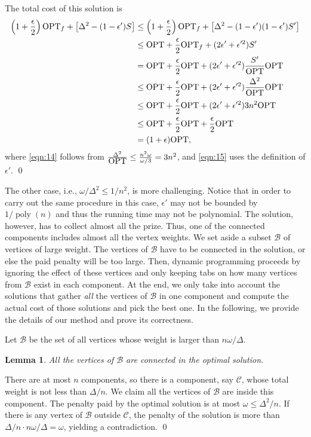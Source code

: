 \documentclass[extras,11pt]{article} \usepackage{fullpage}
\theoremstyle{mytheorem}
\newtheorem{lemma}[theorem]{Lemma}
\renewenvironment{proof}{\par\noindent{\bf Proof.}\hspace{0.5em}}
    {\hfill\qed\vspace{1ex}}
\DeclareMathOperator{\poly}{poly}
\newcommand{\eps}{\epsilon}
\newcommand{\B}{\mathcal{B}}
\newcommand{\OPT}{\mbox{\rm OPT}}
\begin{document}
\begin{proof} The total cost of this solution is
\begin{align}
       \left(1+\frac{\eps}{2}\right)\OPT_f + \left[\Delta^2 - (1-\eps')S\right]
&\leq  \left(1+\frac{\eps}{2}\right)\OPT_f + \left[\Delta^2 - (1-\eps')(1-\eps')S'\right]  \nonumber \\
&\leq  \OPT + \frac{\eps}{2}\OPT_f + (2\eps'+\eps'^2)S'  \nonumber \\
&=  \OPT + \frac{\eps}{2}\OPT + (2\eps'+\eps'^2)\frac{S'}{\OPT}\OPT  \nonumber\\
&\leq  \OPT + \frac{\eps}{2}\OPT + (2\eps'+\eps'^2)\frac{\Delta^2}{\OPT}\OPT   \nonumber\\
&\leq  \OPT + \frac{\eps}{2}\OPT + (2\eps'+\eps'^2){3}{n^2}\OPT  \label{eqn:14}\\
&\leq  \OPT + \frac{\eps}{2}\OPT + \frac{\eps}{2}\OPT  \label{eqn:15}\\
&=     (1+\eps)\OPT,  \nonumber
\end{align}
where \eqref{eqn:14} follows from $\frac{\Delta^2}{\OPT} \leq \frac{n^2\omega}{\omega/3} = 3n^2$,
and \eqref{eqn:15} uses the definition of $\eps'$.
\end{proof}





The other case, i.e., $\omega/\Delta^2\leq 1/n^2$, is more challenging.
Notice that in order to carry out the same procedure in this case, $\eps'$ may not be bounded by $1/\poly(n)$ and thus the running time may not be polynomial.
The solution, however, has to collect almost all the prize.
Thus, one of the connected components includes almost all the vertex weights.
We set aside a subset $\B$ of vertices of large weight.
The vertices of $\B$ have to be connected in the solution, or else the paid penalty will be too large. Then, dynamic programming proceeds by ignoring the effect of these vertices and only keeping tabs on how many vertices from $\B$ exist in each component.
At the end, we only take into account the solutions that gather \emph{all} the vertices of $\B$ in one component and compute the actual cost of those solutions and pick the best one.
In the following, we provide the details of our method and prove its correctness.

Let $\B$ be the set of all vertices whose weight is larger than $n\omega/\Delta$.
\begin{lemma}\label{lem:large-comp}
All the vertices of $\B$ are connected in the optimal solution.
\end{lemma}
\begin{proof}
  There are at most $n$ components, so there is a component, say $\mathcal{C}$,
 whose total weight is not less than $\Delta/n$.
  We claim all the vertices of $\B$ are inside this component.
  The penalty paid by the optimal solution is at most $\omega \leq \Delta^2/n$.
  If there is any vertex of $\B$ outside $\mathcal{C}$, the penalty of
 the solution is more than $\Delta/n\cdot n\omega/\Delta =\omega$,
 yielding a contradiction.
\end{proof}
\end{document}
